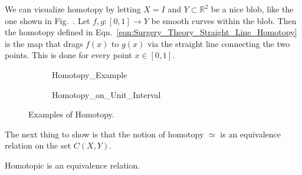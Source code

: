 \documentclass[crop=false,class=book,oneside]{standalone}
\begin{document}
            We can visualize homotopy by letting $X=I$
            and $Y\subset\mathbb{R}^{2}$ be a nice blob,
            like the one shown in
            Fig.~.
            Let $f,g:[0,1]\rightarrow Y$
            be smooth curves within the blob. Then the homotopy
            defined in Eqn.~\ref{eqn:Surgery_Theory_Straight_Line_Homotopy}
            is the map that drags $f(x)$ to $g(x)$ via the straight line
            connecting the two points. This is done for every point $x\in [0,1]$.
            \begin{figure}[H]
                \centering
                \captionsetup{type=figure}
                \begin{subfigure}[b]{0.49\textwidth}
                    \centering
                    \captionsetup{type=figure}
                    {Homotopy_Example}
                    \label{fig:surgery_theory_course_homotopy_diagram_%
                           for_depicting_what_a_homotopy_is}
                \end{subfigure}
                \begin{subfigure}[b]{0.49\textwidth}
                    \centering
                    \captionsetup{type=figure}
                    {Homotopy_on_Unit_Interval}
                    \label{fig:surgery_theory_course_homotopy_diagram_%
                           for_straight_line_homotopy}
                \end{subfigure}
                \caption{Examples of Homotopy.}
            \end{figure}
            The next thing to show is that the notion of
            homotopy $\simeq$ is an equivalence relation on the
            set $C(X,Y)$.
            \begin{theorem}
                Homotopic is an equivalence relation.
            \end{theorem}
\end{document}
